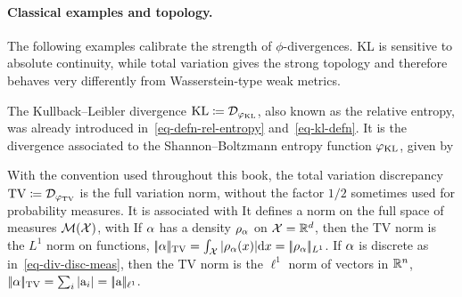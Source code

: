 \paragraph{Classical examples and topology.}

The following examples calibrate the strength of $\phi$-divergences. KL is sensitive to absolute continuity, while total variation gives the strong topology and therefore behaves very differently from Wasserstein-type weak metrics.

\begin{example}
\label{ex_KLdiv}
The Kullback--Leibler divergence $\operatorname{KL} \coloneqq \mathcal{D}_{\varphi_{\operatorname{KL}}}$, also known as the relative entropy, was already introduced in~\eqref{eq-defn-rel-entropy} and~\eqref{eq-kl-defn}. It is the divergence associated to the Shannon--Boltzmann entropy function $\varphi_{\operatorname{KL}}$, given by
\end{example}

\begin{example}\label{exmp-tv}
With the convention used throughout this book, the total variation discrepancy $\operatorname{TV} \coloneqq \mathcal{D}_{\varphi_{\operatorname{TV}}}$ is the full variation norm, without the factor $1/2$ sometimes used for probability measures. It is associated with
It defines a norm on the full space of measures $\mathcal{M}(\mathcal{X})$, with
If $\alpha$ has a density $\rho_{\alpha}$ on $\mathcal{X}=\mathbb{R}^d$, then the TV norm is the $L^1$ norm on functions, $|\!| \alpha |\!|_{\operatorname{TV}} = \int_{\mathcal{X}} |\rho_{\alpha}(x)| \mathrm{d} x = |\!| \rho_{\alpha} |\!|_{L^1}$.
%
If $\alpha$ is discrete as in~\eqref{eq-div-disc-meas}, then the TV norm is the $\ell^1$ norm of vectors in $\mathbb{R}^n$, $|\!| \alpha |\!|_{\operatorname{TV}}=\sum_i |\mathrm{a}_i| = |\!| \mathrm{a} |\!|_{\ell^1}$.
\end{example}

